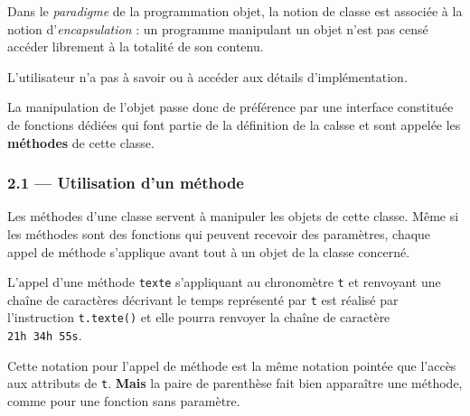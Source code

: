 \documentclass[a4paper,17pt]{extarticle}
\begin{document}
    Dans le \emph{paradigme} de la programmation objet, la notion de classe
est associée à la notion d'\emph{encapsulation} : un programme
manipulant un objet n'est pas censé accéder librement à la totalité de
son contenu.

L'utilisateur n'a pas à savoir ou à accéder aux détails
d'implémentation.

La manipulation de l'objet passe donc de préférence par une interface
constituée de fonctions dédiées qui font partie de la définition de la
calsse et sont appelée les \textbf{méthodes} de cette classe.

    \hypertarget{utilisation-dun-muxe9thode}{%
\subsubsection{2.1 --- Utilisation d'un
méthode}\label{utilisation-dun-muxe9thode}}

    Les méthodes d'une classe servent à manipuler les objets de cette
classe. Même si les méthodes sont des fonctions qui peuvent recevoir des
paramètres, chaque appel de méthode s'applique avant tout à un objet de
la classe concerné.
\begin{exemple}
    L'appel d'une méthode \texttt{texte} s'appliquant au chronomètre
\texttt{t} et renvoyant une chaîne de caractères décrivant le temps
représenté par \texttt{t} est réalisé par l'instruction
\texttt{t.texte()} et elle pourra renvoyer la chaîne de caractère
\texttt{\textquotesingle{}21h\ 34h\ 55s\textquotesingle{}}.

        \end{exemple}
    Cette notation pour l'appel de méthode est la même notation pointée que
l'accès aux attributs de \texttt{t}. \textbf{Mais} la paire de
parenthèse fait bien apparaître une méthode, comme pour une fonction
sans paramètre.
\end{document}

